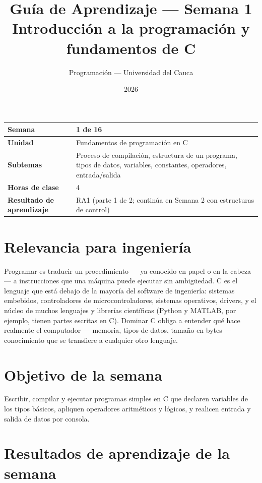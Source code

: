 \documentclass[11pt,letterpaper]{article}
\title{\textcolor{unicaucaverde}{\Large Guía de Aprendizaje --- Semana 1}\\[4pt]
  \large Introducción a la programación y fundamentos de C}
\author{Programación --- Universidad del Cauca}
\date{2026}
\begin{document}
\maketitle

\begin{center}
\begin{tabular}{|>{\bfseries}p{4cm}|p{10cm}|}
\hline
Semana & 1 de 16 \\ \hline
Unidad & Fundamentos de programación en C \\ \hline
Subtemas & Proceso de compilación, estructura de un programa, tipos de datos, variables,
  constantes, operadores, entrada/salida \\ \hline
Horas de clase & 4 \\ \hline
Resultado de aprendizaje & RA1 (parte 1 de 2; continúa en Semana 2 con estructuras de control) \\ \hline
\end{tabular}
\end{center}

\section*{Relevancia para ingeniería}

Programar es traducir un procedimiento --- ya conocido en papel o en la cabeza --- a instrucciones
que una máquina puede ejecutar sin ambigüedad. C es el lenguaje que está debajo de la mayoría del
software de ingeniería: sistemas embebidos, controladores de microcontroladores, sistemas
operativos, drivers, y el núcleo de muchos lenguajes y librerías científicas (Python y MATLAB, por
ejemplo, tienen partes escritas en C). Dominar C obliga a entender qué hace realmente el computador
--- memoria, tipos de datos, tamaño en bytes --- conocimiento que se transfiere a cualquier otro
lenguaje.

\section{Objetivo de la semana}

Escribir, compilar y ejecutar programas simples en C que declaren variables de los tipos básicos,
apliquen operadores aritméticos y lógicos, y realicen entrada y salida de datos por consola.

\section{Resultados de aprendizaje de la semana}
\end{document}
